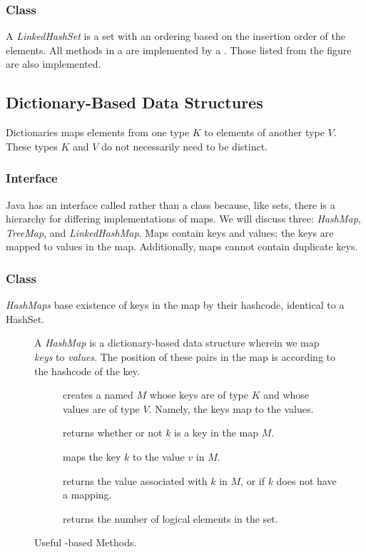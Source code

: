 \subsubsection*{ Class}
A \textit{LinkedHashSet} is a set with an ordering based on the insertion order of the elements. All methods in a  are implemented by a . Those listed from the  figure are also implemented.

\subsection*{Dictionary-Based Data Structures}
Dictionaries maps elements from one type $K$ to elements of another type $V$. These types $K$ and $V$ do not necessarily need to be distinct. 

\subsubsection*{ Interface}
Java has an interface called  rather than a class because, like sets, there is a hierarchy for differing implementations of maps. We will discuss three: \textit{HashMap}, \textit{TreeMap}, and \textit{LinkedHashMap}. Maps contain keys and values; the keys are mapped to values in the map. Additionally, maps cannot contain duplicate keys.

\subsubsection*{ Class}
\textit{HashMaps} base existence of keys in the map by their hashcode, identical to a HashSet. 
\begin{figure}[tp]
  \small
  \begin{tcolorbox}[title=Java Hash Maps]
    A \textit{HashMap} is a dictionary-based data structure wherein we map \textit{keys} to \textit{values}. The position of these pairs in the map is according to the hashcode of the key.
    \vspace{2ex}
  \begin{description}
    \item [] creates a  named $M$ whose keys are of type $K$ and whose values are of type $V$. Namely, the keys map to the values.
     \item [] returns whether or not $k$ is a key in the map $M$.
     \item [] maps the key $k$ to the value $v$ in $M$.
     \item [] returns the value associated with $k$ in $M$, or  if $k$ does not have a mapping.
    \item [] returns the number of logical elements in the set.
  \end{description}
\end{tcolorbox}
  \caption{Useful -based Methods.}
  \label{fig:hashmap}
\end{figure}

